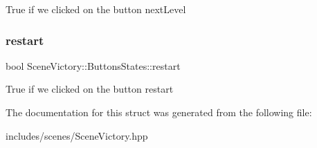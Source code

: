 True if we clicked on the button next\+Level \mbox{\label{struct_scene_victory_1_1_buttons_states_af0bcebde97f25cd4ea16141b88d55017}} 
\subsubsection{\texorpdfstring{restart}{restart}}
{\footnotesize\ttfamily bool Scene\+Victory\+::\+Buttons\+States\+::restart}

True if we clicked on the button restart 

The documentation for this struct was generated from the following file\+:\begin{DoxyCompactItemize}
\item 
includes/scenes/Scene\+Victory.\+hpp\end{DoxyCompactItemize}
